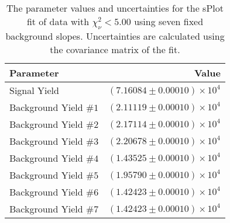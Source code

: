 
\begin{table}[ht]
    \begin{center}
        \begin{tabular}{lr}\toprule
            Parameter & Value \\\midrule
            Signal Yield & $(7.16084 \pm 0.00010) \times 10^{4}$ \\
            Background Yield $\#1$ & $(2.11119 \pm 0.00010) \times 10^{4}$ \\
            Background Yield $\#2$ & $(2.17114 \pm 0.00010) \times 10^{4}$ \\
            Background Yield $\#3$ & $(2.20678 \pm 0.00010) \times 10^{4}$ \\
            Background Yield $\#4$ & $(1.43525 \pm 0.00010) \times 10^{4}$ \\
            Background Yield $\#5$ & $(1.95790 \pm 0.00010) \times 10^{4}$ \\
            Background Yield $\#6$ & $(1.42423 \pm 0.00010) \times 10^{4}$ \\
            Background Yield $\#7$ & $(1.42423 \pm 0.00010) \times 10^{4}$ \\\bottomrule
        \end{tabular}
        \caption{The parameter values and uncertainties for the sPlot fit of data with $\chi^2_\nu < 5.00$ using seven fixed background slopes. Uncertainties are calculated using the covariance matrix of the fit.}\label{tab:splot-fit-results-chisqdof-5.00-fixed-7}
    \end{center}
\end{table}
